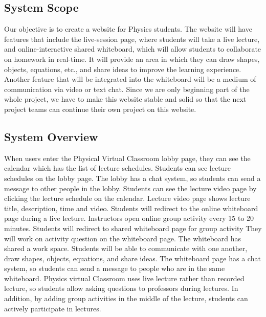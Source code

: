 \documentclass[10pt]{article}
\begin{document}
    \subsection{System Scope}
        Our objective is to create a website for Physics students. The website will have features that include the live-session page, where students will take a live lecture, and online-interactive shared whiteboard, which will allow students to collaborate on homework in real-time. It will provide an area in which they can draw shapes, objects, equations, etc., and share ideas to improve the learning experience. Another feature that will be integrated into the whiteboard will be a medium of communication via video or text chat. Since we are only beginning part of the whole project, we have to make this website stable and solid so that the next project teams can continue their own project on this website.

    \subsection{System Overview}
        When users enter the Physical Virtual Classroom lobby page, they can see the calendar which has the list of lecture schedules. Students can see lecture schedules on the lobby page. The lobby has a chat system, so students can send a message to other people in the lobby. Students can see the lecture video page by clicking the lecture schedule on the calendar. Lecture video page shows lecture title, description, time and video. Students will redirect to the online whiteboard page during a live lecture. Instructors open online group activity every 15 to 20 minutes. Students will redirect to shared whiteboard page for group activity They will work on activity question on the whiteboard page. The whiteboard has shared a work space. Students will be able to communicate with one another, draw shapes, objects, equations, and share ideas. The whiteboard page has a chat system, so students can send a message to people who are in the same whiteboard. Physics virtual Classroom uses live lecture rather than recorded lecture, so students allow asking questions to professors during lectures. In addition, by adding group activities in the middle of the lecture, students can actively participate in lectures.
\end{document}
